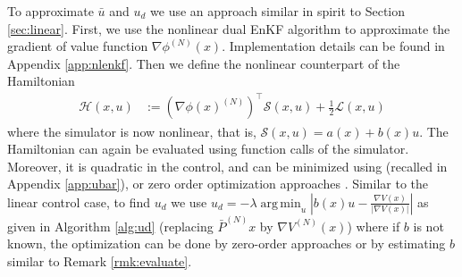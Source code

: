\documentclass[10pt,a4paper]{amsart}
\newcommand{\tp}{^\top}
\renewcommand{\S}{\mathcal{S}}
\newcommand{\ham}{\mathcal{H}}
\newcommand{\half}{\frac{1}{2}}
\DeclareMathOperator*{\argmin}{arg\,min}
\newcommand{\grad}{\nabla}
\renewcommand{\L}{\mathcal{L}}
\begin{document}
To approximate $\bar{u}$ and $u_d$ we use an approach similar in spirit to Section \ref{sec:linear}. First, we use the nonlinear dual EnKF algorithm \cite{joshi-2022} to approximate the gradient of value function $\grad \phi^{(N)}(x)$. Implementation details can be found in Appendix \ref{app:nlenkf}.
Then we define the nonlinear counterpart of the Hamiltonian  
\begin{align} \label{eq:ham-nl}
\ham(x,u) &:= (\grad \phi(x)^{(N)})\tp \S(x,u) + \half\L(x,u)
\end{align}
where the simulator is now nonlinear, that is, $\S(x,u) = a(x) + b(x)u$. The Hamiltonian can again be evaluated using function calls of the simulator. Moreover, it is quadratic in the control, and can be minimized using \cite[Algorithm 2]{joshi-2022} (recalled in Appendix \ref{app:ubar}), or zero order optimization approaches \cite{bach-2016}. Similar to the linear control case, to find $u_d$ we use $u_d = -\lambda \argmin_{u} | b(x)u - \frac{\grad V(x)}{| \grad V(x)|} |$ as given in Algorithm \ref{alg:ud} (replacing $\bar{P}^{(N)}x$ by $\grad V^{(N)}(x)$) where if $b$ is not known, the optimization can be done by zero-order approaches \cite{bach-2016} or by estimating $b$ similar to Remark \ref{rmk:evaluate}.
\end{document}
